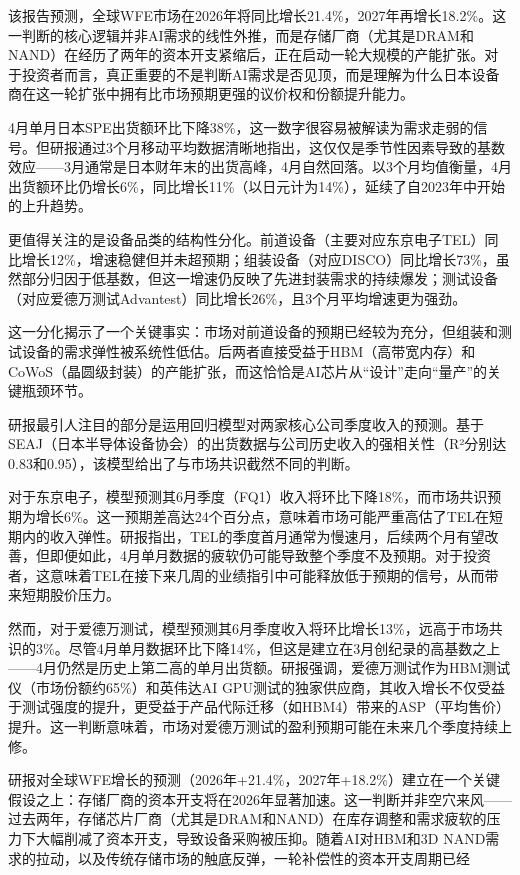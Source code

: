 \documentclass[11pt]{ctexart}
\begin{document}
该报告预测，全球WFE市场在2026年将同比增长21.4\%，2027年再增长18.2\%。这一判断的核心逻辑并非AI需求的线性外推，而是存储厂商（尤其是DRAM和NAND）在经历了两年的资本开支紧缩后，正在启动一轮大规模的产能扩张。对于投资者而言，真正重要的不是判断AI需求是否见顶，而是理解为什么日本设备商在这一轮扩张中拥有比市场预期更强的议价权和份额提升能力。

4月单月日本SPE出货额环比下降38\%，这一数字很容易被解读为需求走弱的信号。但研报通过3个月移动平均数据清晰地指出，这仅仅是季节性因素导致的基数效应——3月通常是日本财年末的出货高峰，4月自然回落。以3个月均值衡量，4月出货额环比仍增长6\%，同比增长11\%（以日元计为14\%），延续了自2023年中开始的上升趋势。

更值得关注的是设备品类的结构性分化。前道设备（主要对应东京电子TEL）同比增长12\%，增速稳健但并未超预期；组装设备（对应DISCO）同比增长73\%，虽然部分归因于低基数，但这一增速仍反映了先进封装需求的持续爆发；测试设备（对应爱德万测试Advantest）同比增长26\%，且3个月平均增速更为强劲。

这一分化揭示了一个关键事实：市场对前道设备的预期已经较为充分，但组装和测试设备的需求弹性被系统性低估。后两者直接受益于HBM（高带宽内存）和CoWoS（晶圆级封装）的产能扩张，而这恰恰是AI芯片从“设计”走向“量产”的关键瓶颈环节。

研报最引人注目的部分是运用回归模型对两家核心公司季度收入的预测。基于SEAJ（日本半导体设备协会）的出货数据与公司历史收入的强相关性（R²分别达0.83和0.95），该模型给出了与市场共识截然不同的判断。

对于东京电子，模型预测其6月季度（FQ1）收入将环比下降18\%，而市场共识预期为增长6\%。这一预期差高达24个百分点，意味着市场可能严重高估了TEL在短期内的收入弹性。研报指出，TEL的季度首月通常为慢速月，后续两个月有望改善，但即便如此，4月单月数据的疲软仍可能导致整个季度不及预期。对于投资者，这意味着TEL在接下来几周的业绩指引中可能释放低于预期的信号，从而带来短期股价压力。

然而，对于爱德万测试，模型预测其6月季度收入将环比增长13\%，远高于市场共识的3\%。尽管4月单月数据环比下降14\%，但这是建立在3月创纪录的高基数之上——4月仍然是历史上第二高的单月出货额。研报强调，爱德万测试作为HBM测试仪（市场份额约65\%）和英伟达AI GPU测试的独家供应商，其收入增长不仅受益于测试强度的提升，更受益于产品代际迁移（如HBM4）带来的ASP（平均售价）提升。这一判断意味着，市场对爱德万测试的盈利预期可能在未来几个季度持续上修。

研报对全球WFE增长的预测（2026年+21.4\%，2027年+18.2\%）建立在一个关键假设之上：存储厂商的资本开支将在2026年显著加速。这一判断并非空穴来风——过去两年，存储芯片厂商（尤其是DRAM和NAND）在库存调整和需求疲软的压力下大幅削减了资本开支，导致设备采购被压抑。随着AI对HBM和3D NAND需求的拉动，以及传统存储市场的触底反弹，一轮补偿性的资本开支周期已经
\end{document}
